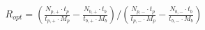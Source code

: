 


\begin{eqnarray*}
  R_{opt} = \left( \frac{N_{p,+} \cdot t_p} {t_{p,+} \cdot M_p} - 
                   \frac{N_{b,+} \cdot t_b} {t_{b,+} \cdot M_b} \right)
            /
            \left( \frac{N_{p,-} \cdot t_p} {t_{p,-} \cdot M_p} - 
                   \frac{N_{b,-} \cdot t_b} {t_{b,-} \cdot M_b} \right)
\end{eqnarray*}

